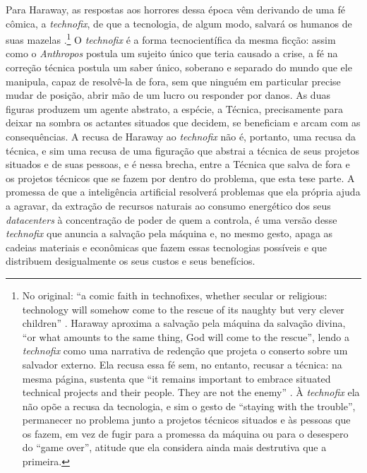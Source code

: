 Para Haraway, as respostas aos horrores dessa época vêm derivando de uma fé cômica, a \emph{technofix}, de que a tecnologia, de algum modo, salvará os humanos de suas mazelas \parencite[p.~3]{Haraway2016Staying}.\footnote{No original: \enquote{a comic faith in technofixes, whether secular or religious: technology will somehow come to the rescue of its naughty but very clever children} \parencite[p.~3, tradução minha]{Haraway2016Staying}. Haraway aproxima a salvação pela máquina da salvação divina, \enquote{or what amounts to the same thing, God will come to the rescue}, lendo a \emph{technofix} como uma narrativa de redenção que projeta o conserto sobre um salvador externo. Ela recusa essa fé sem, no entanto, recusar a técnica: na mesma página, sustenta que \enquote{it remains important to embrace situated technical projects and their people. They are not the enemy} \parencite[p.~3, tradução minha]{Haraway2016Staying}. À \emph{technofix} ela não opõe a recusa da tecnologia, e sim o gesto de \enquote{staying with the trouble}, permanecer no problema junto a projetos técnicos situados e às pessoas que os fazem, em vez de fugir para a promessa da máquina ou para o desespero do \enquote{game over}, atitude que ela considera ainda mais destrutiva que a primeira.} O \emph{technofix} é a forma tecnocientífica da mesma ficção: assim como o \textit{Anthropos} postula um sujeito único que teria causado a crise, a fé na correção técnica postula um saber único, soberano e separado do mundo que ele manipula, capaz de resolvê-la de fora, sem que ninguém em particular precise mudar de posição, abrir mão de um lucro ou responder por danos. As duas figuras produzem um agente abstrato, a espécie, a Técnica, precisamente para deixar na sombra os actantes situados que decidem, se beneficiam e arcam com as consequências. A recusa de Haraway ao \emph{technofix} não é, portanto, uma recusa da técnica, e sim uma recusa de uma figuração que abstrai a técnica de seus projetos situados e de suas pessoas, e é nessa brecha, entre a Técnica que salva de fora e os projetos técnicos que se fazem por dentro do problema, que esta tese parte. A promessa de que a inteligência artificial resolverá problemas que ela própria ajuda a agravar, da extração de recursos naturais ao consumo energético dos seus \emph{datacenters} à concentração de poder de quem a controla, é uma versão desse \emph{technofix} que anuncia a salvação pela máquina e, no mesmo gesto, apaga as cadeias materiais e econômicas que fazem essas tecnologias possíveis e que distribuem desigualmente os seus custos e seus benefícios.

